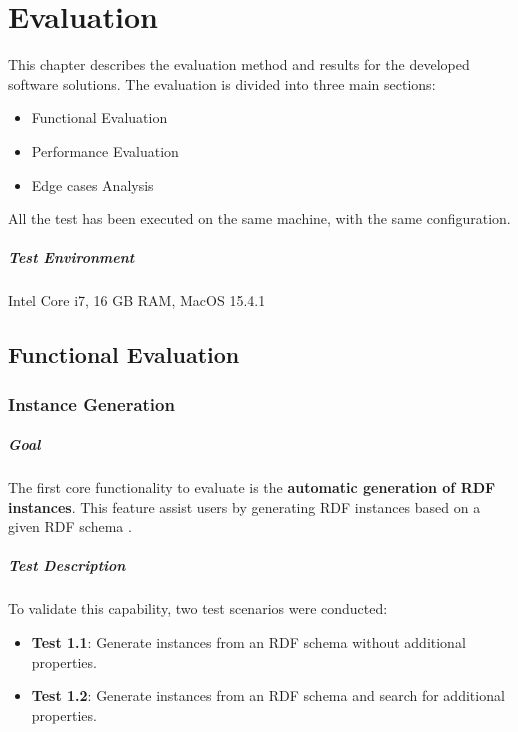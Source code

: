 \chapter{Evaluation\label{cha:chapter5}}

This chapter describes the evaluation method and results for the developed software solutions. 
The evaluation is divided into three main sections: 
\begin{itemize}
    \item Functional Evaluation
    \item Performance Evaluation
    \item Edge cases Analysis
\end{itemize}

All the test has been executed on the same machine, with the same configuration. \paragraph{Test Environment} Intel Core i7, 16 GB RAM, MacOS 15.4.1 

    


\section{Functional Evaluation}

\subsection{Instance Generation}

\paragraph{Goal}
The first core functionality to evaluate is the \textbf{automatic generation of RDF instances}. This feature assist users by generating RDF instances based on a given RDF schema .

\paragraph{Test Description}
To validate this capability, two test scenarios were conducted:
\begin{itemize}
    \item \textbf{Test 1.1}: Generate instances from an RDF schema without additional properties.
    \item \textbf{Test 1.2}: Generate instances from an RDF schema and search for additional properties.
\end{itemize}

